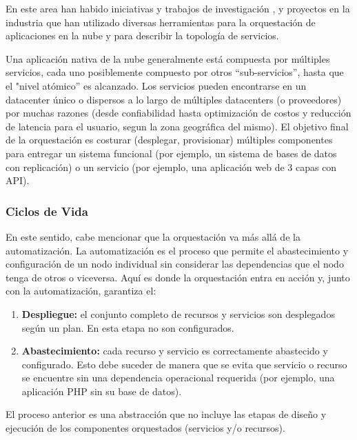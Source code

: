         En este area han habido iniciativas y trabajos de investigación \parencite{Antonescu2012-ml,Juve2011-ob,Liu2011-vw,Binz2012-ru}, y proyectos en la industria \parencite{Ibm2016-xb,Ibm2013-az} que han utilizado diversas herramientas para la orquestación de aplicaciones en la nube y para describir la topología de servicios.
        
        Una aplicación nativa de la nube generalmente está compuesta por múltiples servicios, cada uno posiblemente compuesto por otros “sub-servicios”, hasta que el "nivel atómico” es alcanzado. Los servicios pueden encontrarse en un datacenter único o dispersos a lo largo de múltiples datacenters (o proveedores) por muchas razones (desde confiabilidad hasta optimización de costos y reducción de latencia para el usuario, segun la zona geográfica del mismo). El objetivo final de la orquestación es costurar (desplegar, provisionar) múltiples componentes para entregar un sistema funcional (por ejemplo, un sistema de bases de datos con replicación) o un servicio (por ejemplo, una aplicación web de 3 capas con API).
	    
	    \subsubsection{Ciclos de Vida}
        En este sentido, cabe mencionar que la orquestación va más allá de la automatización. La automatización es el proceso que permite el abastecimiento y configuración de un nodo individual sin considerar las dependencias que el nodo tenga de otros o viceversa. Aquí es donde la orquestación entra en acción y, junto con la automatización, garantiza el:
        
        \begin{enumerate}
            \item \textbf{Despliegue: }el conjunto completo de recursos y servicios son desplegados según un plan. En esta etapa no son configurados.
            
            \item \textbf{Abastecimiento:} cada recurso y servicio es correctamente abastecido y configurado. Esto debe suceder de manera que se evita que servicio o recurso se encuentre sin una dependencia operacional requerida (por ejemplo, una aplicación PHP sin su base de datos).
        \end{enumerate}

	    El proceso anterior es una abstracción que no incluye las etapas de diseño y ejecución de los componentes orquestados (servicios y/o recursos).
        
